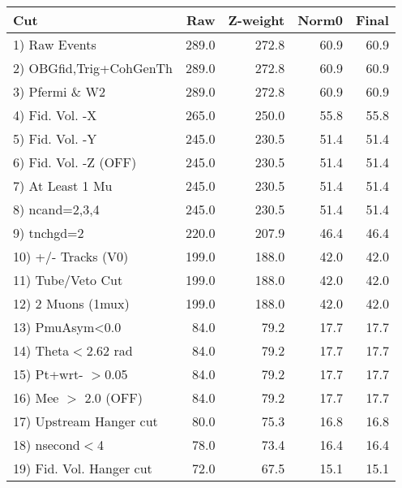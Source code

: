 \begin{table}[h!]\centering
 \begin{tabular}{||l||r|r|r|r||}
 \hline
 \hline
 Cut & Raw & Z-weight & Norm0 & Final \\
 \hline
  1) Raw Events           &       289.0 &       272.8 &        60.9 &        60.9 \\
  2) OBGfid,Trig+CohGenTh &       289.0 &       272.8 &        60.9 &        60.9 \\
  3) Pfermi \& W2         &       289.0 &       272.8 &        60.9 &        60.9 \\
  4) Fid. Vol. -X         &       265.0 &       250.0 &        55.8 &        55.8 \\
  5) Fid. Vol. -Y         &       245.0 &       230.5 &        51.4 &        51.4 \\
  6) Fid. Vol. -Z (OFF)   &       245.0 &       230.5 &        51.4 &        51.4 \\
  7) At Least 1 Mu        &       245.0 &       230.5 &        51.4 &        51.4 \\
  8) ncand=2,3,4          &       245.0 &       230.5 &        51.4 &        51.4 \\
  9) tnchgd=2             &       220.0 &       207.9 &        46.4 &        46.4 \\
 10) +/- Tracks (V0)      &       199.0 &       188.0 &        42.0 &        42.0 \\
 11) Tube/Veto Cut        &       199.0 &       188.0 &        42.0 &        42.0 \\
 12) 2 Muons (1mux)       &       199.0 &       188.0 &        42.0 &        42.0 \\
 13) PmuAsym<0.0          &        84.0 &        79.2 &        17.7 &        17.7 \\
 14) Theta$<$2.62 rad     &        84.0 &        79.2 &        17.7 &        17.7 \\
 15) Pt+wrt- $>$0.05      &        84.0 &        79.2 &        17.7 &        17.7 \\
 16) Mee $>$ 2.0  (OFF)   &        84.0 &        79.2 &        17.7 &        17.7 \\
 17) Upstream Hanger cut  &        80.0 &        75.3 &        16.8 &        16.8 \\
 18) nsecond$<$4          &        78.0 &        73.4 &        16.4 &        16.4 \\
 19) Fid. Vol. Hanger cut &        72.0 &        67.5 &        15.1 &        15.1 \\

\end{tabular}
\end{table}
